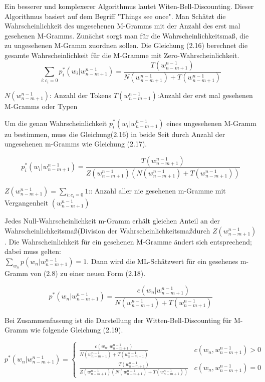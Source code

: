 Ein besserer und komplexerer Algorithmus lautet Witen-Bell-Discounting.
Dieser Algorithmus basiert auf dem Begriff "Things see once". Man Sch\"atzt die Wahrscheinlichkeit des ungesehenen M-Gramms mit der Anzahl des erst mal gesehenen M-Gramms. Zun\"achst sorgt man f\"ur die Wahrscheinlichkeitsma\ss , die zu ungesehenen M-Gramm zuordnen sollen. Die Gleichung (2.16) berechnet die  gesamte Wahrscheinlichkeit f\"ur  die M-Gramme mit Zero-Wahrscheinlichkeit.
\begin{equation}
\label{equation:witten_bell_01}
\sum_{i:c_{i}=0}p_{i}^{*}(w_{i}|w_{n-m+1}^{n-1})=\frac{T(w_{n-m+1}^{n-1})}{N(w_{n-m+1}^{n-1})+T(w_{n-m+1}^{n-1})}
\end{equation}

$N(w_{n-m+1}^{n-1})$: Anzahl der Tokens
$T(w_{n-m+1}^{n-1})$:Anzahl der erst mal gesehenen M-Gramms oder Typen

Um die genau Wahrscheinlichkeit $p_{i}^{*}(w_{i}|w_{n-m+1}^{n-1})$ eines ungesehenen M-Gramm zu bestimmen, muss die Gleichung(2.16) in beide Seit durch Anzahl der ungesehenen m-Gramms wie Gleichung (2.17).

\begin{equation}
\label{equation:witten_bell_02}
p_{i}^{*}(w_{i}|w_{n-m+1}^{n-1})=\frac{T(w_{n-m+1}^{n-1})}{Z(w_{n-m+1}^{n-1})(N(w_{n-m+1}^{n-1})+T(w_{n-m+1}^{n-1}))}
\end{equation}

$Z(w_{n-m+1}^{n-1})=\sum_{i:c_{i}=0}1$:: Anzahl aller nie gesehenen m-Gramme mit Vergangenheit $(w_{n-m+1}^{n-1})$

Jedes Null-Wahrscheinlichkeit m-Gramm erh\"alt gleichen Anteil an der Wahrscheinlichkeitsma\ss (Division der Wahrscheinlichkeitsma\ss durch $Z(w_{n-m+1}^{n-1})$.
Die Wahrscheinlichkeit f\"ur ein gesehenen M-Gramme \"andert sich entsprechend; dabei muss gelten:\\ 
$\sum_{w_{n}}p(w_{n}|w_{n-m+1}^{n-1})=1$. Dann wird die ML-Sch\"atzwert  f\"ur ein gesehenes m-Gramm von (2.8) zu einer neuen Form (2.18). 

\begin{equation}
\label{equation:witten_bell_03}
p^{*}(w_{n}|w_{n-m+1}^{n-1})=\frac{c(w_{n}|w_{n-m+1}^{n-1})}{N(w_{n-m+1}^{n-1})+T(w_{n-m+1}^{n-1})}
\end{equation}

Bei Zusammenfassung ist die Darstellung der Witten-Bell-Discounting f\"ur M-Gramm wie folgende Gleichung (2.19).

\begin{equation}
\label{equationo:witten_bell_04}
p^{*}(w_{n}|w_{n-m+1}^{n-1})=\begin{cases}
\frac{c(w_{n},w_{n-m+1}^{n-1})}{N(w_{n-m+1}^{n-1})+T(w_{n-m+1}^{n-1})} & c(w_{n},w_{n-m+1}^{n-1})>0 \\
\frac{T(w_{n-m+1}^{n-1})}{Z(w_{n-m+1}^{n-1})(N(w_{n-m+1}^{n-1})+T(w_{n-m+1}^{n-1}))} & c(w_{n},w_{n-m+1}^{n-1})=0 
\end{cases}
\end{equation}
